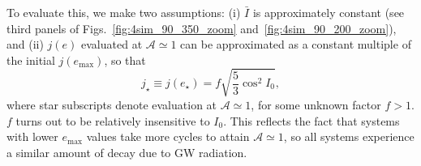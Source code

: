 \documentclass[
        twocolumn,
        twocolappendix
    ]{aastex63}
\begin{document}
To evaluate this, we make two assumptions: (i) $\bar{I}$ is approximately
constant (see third panels of Figs.~\ref{fig:4sim_90_350_zoom}
and~\ref{fig:4sim_90_200_zoom}), and (ii) $j(e)$ evaluated at $\mathcal{A}
\simeq 1$ can be approximated as a constant multiple of the initial
$j(e_{\max})$, so that
\begin{equation}
    j_{\star} \equiv j(e_{\star}) = f
        \sqrt{\frac{5}{3}\cos^2 I_0},\label{eq:jstar_ansatz}
\end{equation}
where star subscripts denote evaluation at $\mathcal{A} \simeq 1$, for some
unknown factor $f > 1$. $f$ turns out to be relatively insensitive to $I_0$.
This reflects the fact that systems with lower $e_{\max}$ values take more
cycles to attain $\mathcal{A} \simeq 1$, so all systems experience a similar
amount of decay due to GW radiation.
\end{document}
